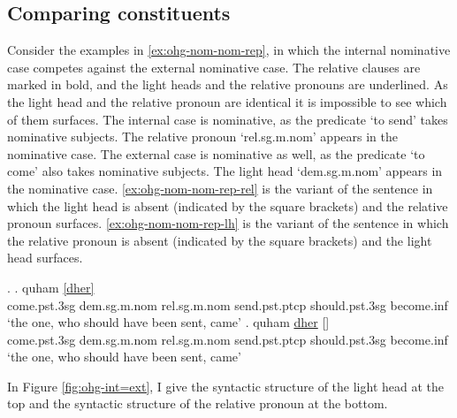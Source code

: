 \subsection{Comparing constituents}

Consider the examples in \ref{ex:ohg-nom-nom-rep}, in which the internal nominative case competes against the external nominative case. The relative clauses are marked in bold, and the light heads and the relative pronouns are underlined. As the light head and the relative pronoun are identical it is impossible to see which of them surfaces.
The internal case is nominative, as the predicate  `to send' takes nominative subjects. The relative pronoun  `\ac{rel}.\ac{sg}.\ac{m}.\ac{nom}' appears in the nominative case.
The external case is nominative as well, as the predicate  `to come' also takes nominative subjects. The light head  `\ac{dem}.\ac{sg}.\ac{m}.\ac{nom}' appears in the nominative case.
\ref{ex:ohg-nom-nom-rep-rel} is the variant of the sentence in which the light head is absent (indicated by the square brackets) and the relative pronoun surfaces.
\ref{ex:ohg-nom-nom-rep-lh} is the variant of the sentence in which the relative pronoun is absent (indicated by the square brackets) and the light head surfaces.

\ex.\label{ex:ohg-nom-nom-rep}
\ag. quham \underline{[dher]}  \underline{}  \\
 come.\ac{pst}.3\ac{sg}\scsub{[nom]} \ac{dem}.\ac{sg}.\ac{m}.\ac{nom} \ac{rel}.\ac{sg}.\ac{m}.\ac{nom} send.\ac{pst}.\ac{ptcp}\scsub{[nom]} should.\ac{pst}.3\ac{sg} become.\ac{inf}\\
 `the one, who should have been sent, came' \label{ex:ohg-nom-nom-rep-rel}
\bg. quham \underline{dher} [] \underline{}  \\
 come.\ac{pst}.3\ac{sg}\scsub{[nom]} \ac{dem}.\ac{sg}.\ac{m}.\ac{nom} \ac{rel}.\ac{sg}.\ac{m}.\ac{nom} send.\ac{pst}.\ac{ptcp}\scsub{[nom]} should.\ac{pst}.3\ac{sg} become.\ac{inf}\\
 `the one, who should have been sent, came' \label{ex:ohg-nom-nom-rep-lh}

In Figure \ref{fig:ohg-int=ext}, I give the syntactic structure of the light head at the top and the syntactic structure of the relative pronoun at the bottom.

